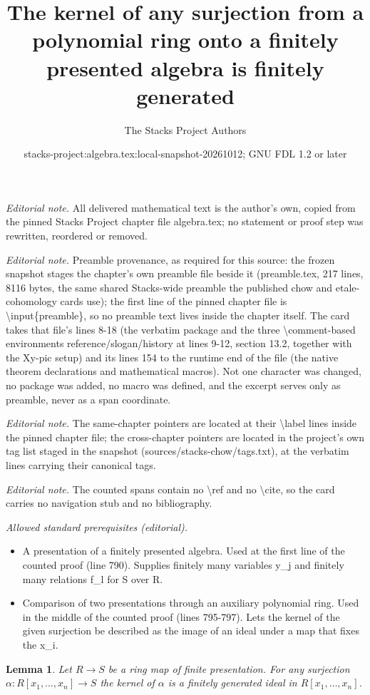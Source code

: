 \documentclass[10pt,a4paper]{amsart}
\title{The kernel of any surjection from a polynomial ring onto a finitely presented algebra is finitely generated}
\author{The Stacks Project Authors}
\date{stacks-project:algebra.tex:local-snapshot-20261012; GNU FDL 1.2 or later}
\theoremstyle{plain}
\newtheorem{lemma}[subsection]{Lemma}
\theoremstyle{definition}
\theoremstyle{remark}
\numberwithin{equation}{subsection}
\begin{document}
\maketitle
\noindent\textit{Editorial note.} All delivered mathematical text is the author's own, copied from the pinned Stacks Project chapter file algebra.tex; no statement or proof step was rewritten, reordered or removed.\par\medskip
\noindent\textit{Editorial note.} Preamble provenance, as required for this source: the frozen snapshot stages the chapter's own preamble file beside it (preamble.tex, 217 lines, 8116 bytes, the same shared Stacks-wide preamble the published chow and etale-cohomology cards use); the first line of the pinned chapter file is \textbackslash{}input\{preamble\}, so no preamble text lives inside the chapter itself. The card takes that file's lines 8-18 (the verbatim package and the three \textbackslash{}comment-based environments reference/slogan/history at lines 9-12, section 13.2, together with the Xy-pic setup) and its lines 154 to the runtime end of the file (the native theorem declarations and mathematical macros). Not one character was changed, no package was added, no macro was defined, and the excerpt serves only as preamble, never as a span coordinate.\par\medskip
\noindent\textit{Editorial note.} The same-chapter pointers are located at their \textbackslash{}label lines inside the pinned chapter file; the cross-chapter pointers are located in the project's own tag list staged in the snapshot (sources/stacks-chow/tags.txt), at the verbatim lines carrying their canonical tags.\par\medskip
\noindent\textit{Editorial note.} The counted spans contain no \textbackslash{}ref and no \textbackslash{}cite, so the card carries no navigation stub and no bibliography.\par\medskip
\noindent\textit{Allowed standard prerequisites (editorial).}\begin{itemize}
\item A presentation of a finitely presented algebra. Used at the first line of the counted proof (line 790). Supplies finitely many variables y\_j and finitely many relations f\_l for S over R.
\item Comparison of two presentations through an auxiliary polynomial ring. Used in the middle of the counted proof (lines 795-797). Lets the kernel of the given surjection be described as the image of an ideal under a map that fixes the x\_i.
\end{itemize}\medskip
\begin{lemma}
\label{lemma-finite-presentation-independent}
Let $R \to S$ be a ring map of finite presentation.
For any surjection $\alpha : R[x_1, \ldots, x_n] \to S$ the
kernel of $\alpha$ is a finitely generated ideal in $R[x_1, \ldots, x_n]$.
\end{lemma}
\end{document}
